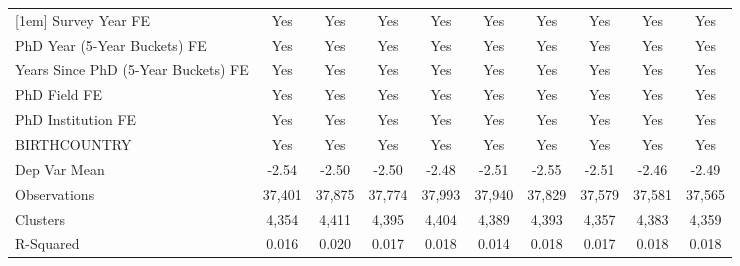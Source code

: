 \begin{table}[htbp]
\begin{tabular}{l*{9}{c}}
[1em]
Survey Year FE&         Yes         &         Yes         &         Yes         &         Yes         &         Yes         &         Yes         &         Yes         &         Yes         &         Yes         \\
[1em]
PhD Year (5-Year Buckets) FE&         Yes         &         Yes         &         Yes         &         Yes         &         Yes         &         Yes         &         Yes         &         Yes         &         Yes         \\
[1em]
Years Since PhD (5-Year Buckets) FE&         Yes         &         Yes         &         Yes         &         Yes         &         Yes         &         Yes         &         Yes         &         Yes         &         Yes         \\
[1em]
PhD Field FE&         Yes         &         Yes         &         Yes         &         Yes         &         Yes         &         Yes         &         Yes         &         Yes         &         Yes         \\
[1em]
PhD Institution FE&         Yes         &         Yes         &         Yes         &         Yes         &         Yes         &         Yes         &         Yes         &         Yes         &         Yes         \\
[1em]
BIRTHCOUNTRY&         Yes         &         Yes         &         Yes         &         Yes         &         Yes         &         Yes         &         Yes         &         Yes         &         Yes         \\
\hline
Dep Var Mean&       -2.54         &       -2.50         &       -2.50         &       -2.48         &       -2.51         &       -2.55         &       -2.51         &       -2.46         &       -2.49         \\
Observations&      37,401         &      37,875         &      37,774         &      37,993         &      37,940         &      37,829         &      37,579         &      37,581         &      37,565         \\
Clusters&       4,354         &       4,411         &       4,395         &       4,404         &       4,389         &       4,393         &       4,357         &       4,383         &       4,359         \\
R-Squared&       0.016         &       0.020         &       0.017         &       0.018         &       0.014         &       0.018         &       0.017         &       0.018         &       0.018         \\

\end{tabular}
\end{table}
